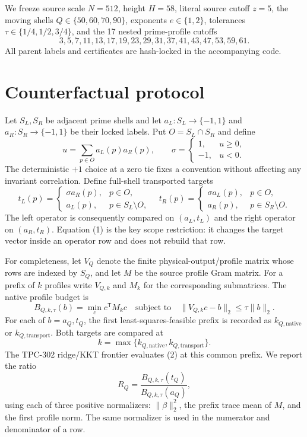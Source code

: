 \documentclass[11pt]{article}
\begin{document}
We freeze source scale $N=512$, height $H=58$, literal source cutoff $z=5$,
the moving shells $Q\in\{50,60,70,90\}$, exponents $e\in\{1,2\}$, tolerances
$\tau\in\{1/4,1/2,3/4\}$, and the 17 nested prime-profile cutoffs
\[
  3,5,7,11,13,17,19,23,29,31,37,41,43,47,53,59,61.
\]
All parent labels and certificates are hash-locked in the accompanying code.

\section{Counterfactual protocol}

Let $S_L,S_R$ be adjacent prime shells and let
$a_L:S_L\to\{-1,1\}$ and $a_R:S_R\to\{-1,1\}$ be their locked labels.  Put
$O=S_L\cap S_R$ and define
\[
 u=\sum_{p\in O}a_L(p)a_R(p),\qquad
 \sigma=\begin{cases}1,&u\geq0,\\-1,&u<0.\end{cases}
\]
The deterministic $+1$ choice at a zero tie fixes a convention without
affecting any invariant correlation.  Define full-shell transported targets
\[
 t_L(p)=\begin{cases}\sigma a_R(p),&p\in O,\\a_L(p),&p\in S_L\setminus O,\end{cases}
 \quad
 t_R(p)=\begin{cases}\sigma a_L(p),&p\in O,\\a_R(p),&p\in S_R\setminus O.\end{cases}
 \tag{1}
\]
The left operator is consequently compared on $(a_L,t_L)$ and the right
operator on $(a_R,t_R)$.  Equation (1) is the key scope restriction: it changes
the target vector inside an operator row and does not rebuild that row.

For completeness, let $V_Q$ denote the finite physical-output/profile matrix
whose rows are indexed by $S_Q$, and let $M$ be the source profile Gram matrix.
For a prefix of $k$ profiles write $V_{Q,k}$ and $M_k$ for the corresponding
submatrices.  The native profile budget is
\[
 B_{Q,k,\tau}(b)=\min_c c^{\mathsf T}M_kc
 \quad\text{subject to}\quad
 \|V_{Q,k}c-b\|_2\leq\tau\|b\|_2.                         \tag{2}
\]
For each of $b=a_Q,t_Q$, the first least-squares-feasible prefix is recorded as
$k_{Q,\mathrm{native}}$ or $k_{Q,\mathrm{transport}}$.  Both targets are
compared at
\[
 k=\max\{k_{Q,\mathrm{native}},k_{Q,\mathrm{transport}}\}. \tag{3}
\]
The TPC-302 ridge/KKT frontier evaluates (2) at this common prefix.  We report
the ratio
\[
 R_Q=\frac{B_{Q,k,\tau}(t_Q)}{B_{Q,k,\tau}(a_Q)},                 \tag{4}
\]
using each of three positive normalizers: $\|\beta\|_2^2$, the prefix trace
mean of $M$, and the first profile norm.  The same normalizer is used in the
numerator and denominator of a row.
\end{document}
